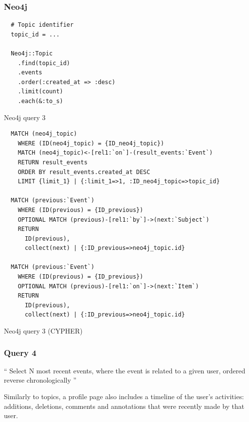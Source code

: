 \subsubsection*{Neo4j}

\begin{listing}[H]
  \begin{verbatim}
  # Topic identifier
  topic_id = ...

  Neo4j::Topic
    .find(topic_id)
    .events
    .order(:created_at => :desc)
    .limit(count)
    .each(&:to_s)
  \end{verbatim}


  \caption{Neo4j query 3}
  \label{lst:neo4j-query-3}
\end{listing}

\begin{listing}[H]
  \begin{verbatim}
  MATCH (neo4j_topic)
    WHERE (ID(neo4j_topic) = {ID_neo4j_topic})
    MATCH (neo4j_topic)<-[rel1:`on`]-(result_events:`Event`)
    RETURN result_events
    ORDER BY result_events.created_at DESC
    LIMIT {limit_1} | {:limit_1=>1, :ID_neo4j_topic=>topic_id}

  MATCH (previous:`Event`)
    WHERE (ID(previous) = {ID_previous})
    OPTIONAL MATCH (previous)-[rel1:`by`]->(next:`Subject`)
    RETURN
      ID(previous),
      collect(next) | {:ID_previous=>neo4j_topic.id}

  MATCH (previous:`Event`)
    WHERE (ID(previous) = {ID_previous})
    OPTIONAL MATCH (previous)-[rel1:`on`]->(next:`Item`)
    RETURN
      ID(previous),
      collect(next) | {:ID_previous=>neo4j_topic.id}
  \end{verbatim}

  \caption{Neo4j query 3 (CYPHER)}
  \label{lst:neo4j-query-3 (CYPHER)}
\end{listing}

\subsubsection{Query 4}
\label{subsubsec:query-4}

``
Select N most recent events, where the event is related to a given user, ordered reverse chronologically
''

Similarly to topics, a profile page also includes a timeline of the user's activities: additions, deletions, comments and annotations that were recently made by that user.


